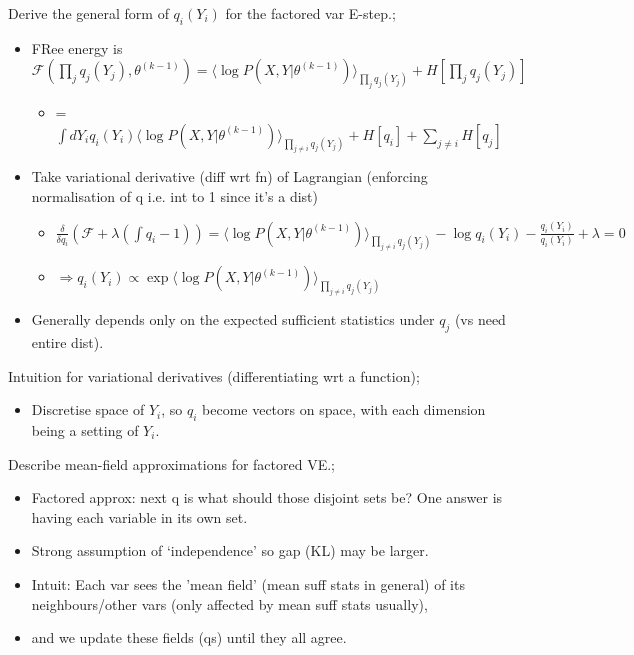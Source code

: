 \documentclass{article}
\begin{document}
Derive the general form of $q_i(Y_i)$ for the factored var E-step.; \begin{itemize} \item FRee energy is $\mathcal{F}(\prod_j q_j(Y_j),\theta^{(k-1)}) = \langle \log P(X,Y|\theta^{(k-1)})\rangle_{\prod_j q_j(Y_j)} +H[\prod_jq_j(Y_j)]$ \begin{itemize} \item = $\int dY_i q_i(Y_i)  \langle \log P(X,Y|\theta^{(k-1)})\rangle_{\prod_{j\ne i} q_j(Y_j)} +H[q_i] +\sum_{j\ne i}H[q_j]$ \end{itemize} \item Take variational derivative (diff wrt fn) of Lagrangian (enforcing normalisation of q i.e. int to 1 since it's a dist) \begin{itemize} \item $\frac{\delta}{\delta q_i} (\mathcal{F}+\lambda (\int q_i - 1)) =  \langle \log P(X,Y|\theta^{(k-1)})\rangle_{\prod_{j\ne i} q_j(Y_j)}- \log q_i(Y_i) - \frac{q_i(Y_i)}{q_i(Y_i)}+\lambda = 0$ \item $\Rightarrow q_i(Y_i) \propto \exp  \langle \log P(X,Y|\theta^{(k-1)})\rangle_{\prod_{j\ne i} q_j(Y_j)}$ \end{itemize} \item Generally depends only on the expected sufficient statistics under $q_j$ (vs need entire dist).  \end{itemize}

Intuition for variational derivatives (differentiating wrt a function); \begin{itemize} \item Discretise space of $Y_i$, so $q_i$ become vectors on space, with each dimension being a setting of $Y_i$.  \end{itemize}

Describe mean-field approximations for factored VE.; \begin{itemize} \item Factored approx: next q is what should those disjoint sets be? One answer is having each variable in its own set.  \item Strong assumption of `independence' so gap (KL) may be larger.  \item Intuit: Each var sees the 'mean field' (mean suff stats in general) of its neighbours/other vars (only affected by mean suff stats usually), \item and we update these fields (qs) until they all agree.  \end{itemize} 
\end{document}
